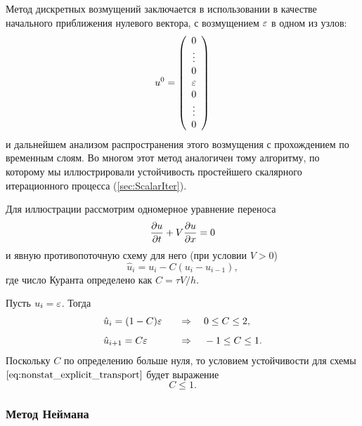 Метод дискретных возмущений заключается
в использовании в качестве начального приближения
нулевого вектора, с возмущением $\varepsilon$
в одном из узлов:
\begin{equation*}
    u^0 = \left(
        \begin{array}{c}
            0\\
            \vdots\\
            0\\
            \varepsilon\\
            0\\
            \vdots\\
            0
        \end{array}
        \right)
\end{equation*}
и дальнейшем анализом
распространения этого возмущения с прохождением
по временным слоям.
Во многом этот метод аналогичен тому алгоритму,
по которому мы иллюстрировали устойчивость
простейшего скалярного итерационного процесса (\ref{sec:ScalarIter}).

\label{sec:NonstatExpTran}

Для иллюстрации рассмотрим одномерное уравнение переноса
\begin{equation}
    \label{eq:nonstat_transport}
    \frac{\partial u}{\partial t} + V\frac{\partial u}{\partial x} = 0
\end{equation}
и явную противопоточную схему для него (при условии $V > 0$)
\begin{equation}
    \label{eq:nonstat_explicit_transport}
    \hat u_i = u_i - C \left(u_i - u_{i-1}\right),
\end{equation}
где число Куранта определено как $C = \tau V /h $.

Пусть $u_i = \varepsilon$. Тогда
\begin{align*}
    & \hat u_i = (1 - C) \varepsilon & \quad\Rightarrow\quad & \; 0 \leq C \leq 2,  \\[5pt]
    & \hat u_{i+1} = C \varepsilon   & \quad\Rightarrow\quad & \; -1 \leq C \leq 1.
\end{align*}
Поскольку $C$ по определению больше нуля, то условием устойчивости для схемы $\eqref{eq:nonstat_explicit_transport}$
будет выражение
\begin{equation*}
    C \leq 1.
\end{equation*}

\subsubsection{Метод Неймана}

